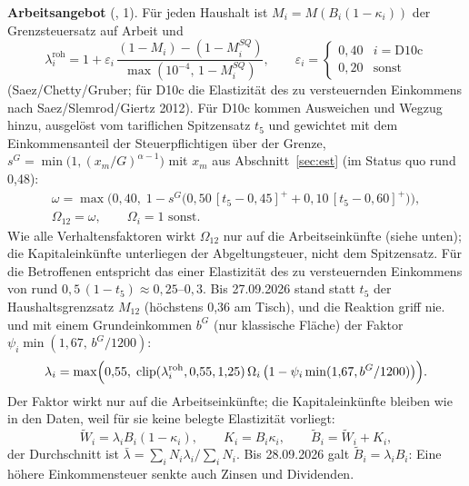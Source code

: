 \textbf{Arbeitsangebot} (, 1). Für jeden Haushalt ist
$M_i=M(B_i(1-\kappa_i))$ der Grenzsteuersatz auf Arbeit und
\begin{equation}
\lambda^{\text{roh}}_i=1+\varepsilon_i\,\frac{(1-M_i)-(1-M^{SQ}_i)}{\max(10^{-4},\,1-M^{SQ}_i)},
\qquad
\varepsilon_i=\begin{cases}0{,}40&i=\text{D10c}\\0{,}20&\text{sonst}\end{cases}
\end{equation}
(Saez\slash{}Chetty\slash{}Gruber; für D10c die Elastizität des zu versteuernden Einkommens nach
Saez\slash{}Slemrod\slash{}Giertz 2012). Für D10c kommen Ausweichen und Wegzug hinzu, ausgelöst
vom tariflichen Spitzensatz $t_5$ und gewichtet mit dem Einkommensanteil der Steuerpflichtigen
über der Grenze, $s^G=\min\bigl(1,(x_m/G)^{\alpha-1}\bigr)$ mit $x_m$ aus Abschnitt~\ref{sec:est}
(im Status quo rund 0,48):
\begin{gather}
\omega=\max\bigl(0{,}40,\;1-s^G\bigl(0{,}50\,[t_5-0{,}45]^+ +0{,}10\,[t_5-0{,}60]^+\bigr)\bigr),\\
\Omega_{12}=\omega,\qquad\Omega_i=1\text{ sonst}.
\end{gather}
Wie alle Verhaltensfaktoren wirkt $\Omega_{12}$ nur auf die Arbeitseinkünfte (siehe unten); die
Kapitaleinkünfte unterliegen der Abgeltungsteuer, nicht dem Spitzensatz. Für die Betroffenen entspricht das
einer Elastizität des zu versteuernden Einkommens von rund $0{,}5\,(1-t_5)\approx0{,}25$--$0{,}3$.
Bis 27.09.2026 stand statt $t_5$ der Haushaltsgrenzsatz $M_{12}$ (höchstens 0,36 am Tisch), und
die Reaktion griff nie.
und mit einem Grundeinkommen $b^{G}$ (nur klassische Fläche) der Faktor $\psi_i\min(1{,}67,\,b^G/1200)$:
\begin{equation}
\lambda_i=\max\Bigl(0{,}55,\;\operatorname{clip}(\lambda^{\text{roh}}_i,0{,}55,1{,}25)\,\Omega_i\,\bigl(1-\psi_i\min(1{,}67,b^G/1200)\bigr)\Bigr).
\end{equation}
Der Faktor wirkt nur auf die Arbeitseinkünfte; die Kapitaleinkünfte bleiben wie in den Daten,
weil für sie keine belegte Elastizität vorliegt:
\begin{equation}
\tilde W_i=\lambda_iB_i(1-\kappa_i),\qquad K_i=B_i\kappa_i,\qquad \tilde B_i=\tilde W_i+K_i,
\end{equation}
der Durchschnitt ist $\bar\lambda=\sum_iN_i\lambda_i/\sum_iN_i$. Bis 28.09.2026 galt
$\tilde B_i=\lambda_iB_i$: Eine höhere Einkommensteuer senkte auch Zinsen und Dividenden.

